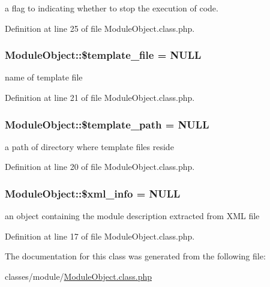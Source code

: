 a flag to indicating whether to stop the execution of code. 



Definition at line 25 of file Module\+Object.\+class.\+php.

\hypertarget{classModuleObject_a6eddf08e627527affc7e835a6d302733}{
\subsubsection[{\$template\+\_\+file}]{\setlength{\rightskip}{0pt plus 5cm}Module\+Object\+::\$template\+\_\+file = N\+U\+L\+L}}\label{classModuleObject_a6eddf08e627527affc7e835a6d302733}


name of template file 



Definition at line 21 of file Module\+Object.\+class.\+php.

\hypertarget{classModuleObject_a8a632bae853adef8e2ab9596a3a86661}{
\subsubsection[{\$template\+\_\+path}]{\setlength{\rightskip}{0pt plus 5cm}Module\+Object\+::\$template\+\_\+path = N\+U\+L\+L}}\label{classModuleObject_a8a632bae853adef8e2ab9596a3a86661}


a path of directory where template files reside 



Definition at line 20 of file Module\+Object.\+class.\+php.

\hypertarget{classModuleObject_aa0003698bcfe16bb25031435df251715}{
\subsubsection[{\$xml\+\_\+info}]{\setlength{\rightskip}{0pt plus 5cm}Module\+Object\+::\$xml\+\_\+info = N\+U\+L\+L}}\label{classModuleObject_aa0003698bcfe16bb25031435df251715}


an object containing the module description extracted from X\+M\+L file 



Definition at line 17 of file Module\+Object.\+class.\+php.



The documentation for this class was generated from the following file\+:\begin{DoxyCompactItemize}
\item 
classes/module/\hyperlink{ModuleObject_8class_8php}{Module\+Object.\+class.\+php}\end{DoxyCompactItemize}
